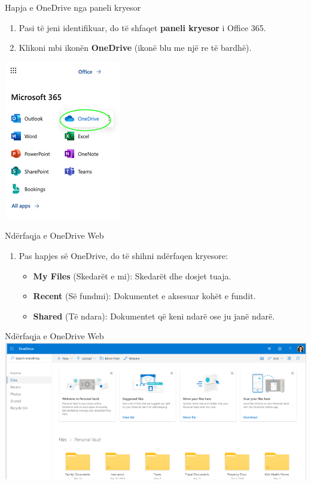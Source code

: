 \documentclass[
  ignorenonframetext,
]{beamer}
\begin{document}
\begin{frame}{Hapja e OneDrive nga paneli kryesor}
\label{hapja-e-onedrive-nga-paneli-kryesor}
\begin{enumerate}
\item
  Pasi të jeni identifikuar, do të shfaqet \textbf{paneli kryesor} i
  Office 365.
\item
  Klikoni mbi ikonën \textbf{OneDrive} (ikonë blu me një re të bardhë).
\end{enumerate}

\includegraphics{./images/onedrive1.png}
\end{frame}

\begin{frame}{Ndërfaqja e OneDrive Web}
\label{nduxebrfaqja-e-onedrive-web}
\begin{enumerate}
\item
  Pas hapjes së OneDrive, do të shihni ndërfaqen kryesore:

  \begin{itemize}
  \item
    \textbf{My Files} (Skedarët e mi): Skedarët dhe dosjet tuaja.
  \item
    \textbf{Recent} (Së fundmi): Dokumentet e aksesuar kohët e fundit.
  \item
    \textbf{Shared} (Të ndara): Dokumentet që keni ndarë ose ju janë
    ndarë.
  \end{itemize}
\end{enumerate}
\end{frame}

\begin{frame}{Ndërfaqja e OneDrive Web}
\label{nduxebrfaqja-e-onedrive-web-1}
\includegraphics{./images/onedrive2.png}
\end{frame}
\end{document}
